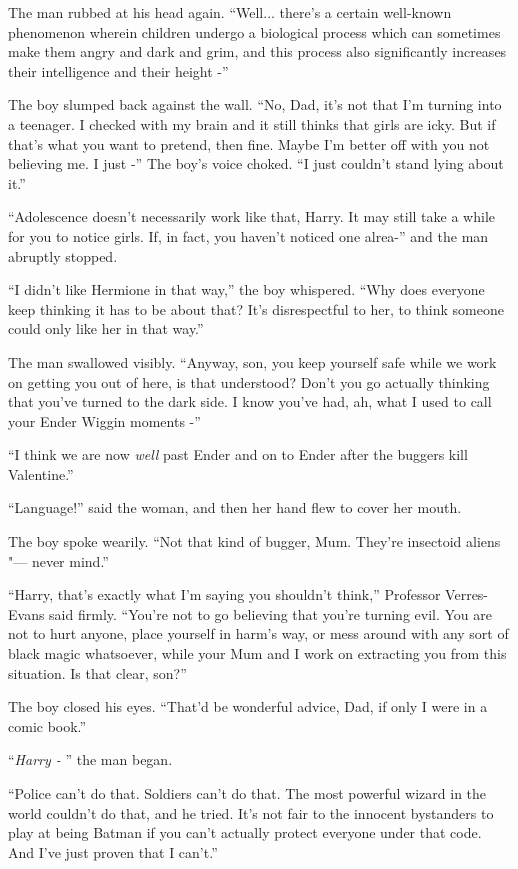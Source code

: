 The man rubbed at his head again. ``Well... there's a certain
well-known phenomenon wherein children undergo a biological process
which can sometimes make them angry and dark and grim, and this process
also significantly increases their intelligence and their height -''

The boy slumped back against the wall. ``No, Dad, it's not that I'm
turning into a teenager. I checked with my brain and it still thinks
that girls are icky. But if that's what you want to pretend, then fine.
Maybe I'm better off with you not believing me. I just -'' The boy's
voice choked. ``I just couldn't stand lying about it.''

``Adolescence doesn't necessarily work like that, Harry. It may still
take a while for you to notice girls. If, in fact, you haven't noticed
one alrea-'' and the man abruptly stopped.

``I didn't like Hermione in that way,'' the boy whispered. ``Why does
everyone keep thinking it has to be about that? It's disrespectful to
her, to think someone could only like her in that way.''

The man swallowed visibly. ``Anyway, son, you keep yourself safe while
we work on getting you out of here, is that understood? Don't you go
actually thinking that you've turned to the dark side. I know you've
had, ah, what I used to call your Ender Wiggin moments -''

``I think we are now \emph{well} past Ender and on to Ender after the
buggers kill Valentine.''

``Language!'' said the woman, and then her hand flew to cover her mouth.

The boy spoke wearily. ``Not that kind of bugger, Mum. They're insectoid
aliens "--- never mind.''

``Harry, that's exactly what I'm saying you shouldn't think,'' Professor
Verres-Evans said firmly. ``You're not to go believing that you're
turning evil. You are not to hurt anyone, place yourself in harm's way,
or mess around with any sort of black magic whatsoever, while your Mum
and I work on extracting you from this situation. Is that clear, son?''

The boy closed his eyes. ``That'd be wonderful advice, Dad, if only I
were in a comic book.''

``\emph{Harry -} '' the man began.

``Police can't do that. Soldiers can't do that. The most powerful wizard
in the world couldn't do that, and he tried. It's not fair to the
innocent bystanders to play at being Batman if you can't actually
protect everyone under that code. And I've just proven that I can't.''

